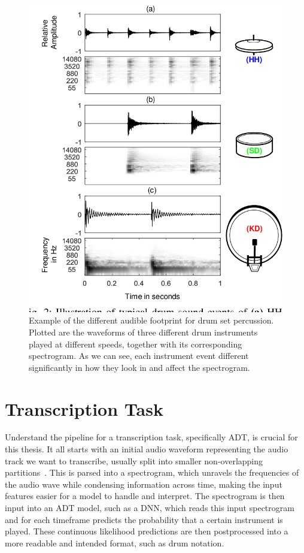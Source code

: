 \begin{figure}[H]
    \centering
    \includegraphics[scale=0.6, trim={0 1cm 0 0},clip]{figures/drumsettimbre}
    \caption{Example of the different audible footprint for drum set percussion. Plotted are the waveforms of three different drum instruments played at different speeds, together with its corresponding spectrogram. As we can see, each instrument event different significantly in how they look in and affect the spectrogram.}
    \label{DrumsetTimbreFigure}
\end{figure}

\section{Transcription Task}

Understand the pipeline for a transcription task, specifically \gls{ADT}, is crucial for this thesis. It all starts with an initial audio waveform representing the audio track we want to transcribe, usually split into smaller non-overlapping partitions~\cite{vogl2018multiinstrumentdrumtranscription, gardner2022mt3multitaskmultitrackmusic}. This is parsed into a spectrogram, which unravels the frequencies of the audio wave while condensing information across time, making the input features easier for a model to handle and interpret. The spectrogram is then input into an \gls{ADT} model, such as a \gls{DNN}, which reads this input spectrogram and for each timeframe predicts the probability that a certain instrument is played. These continuous likelihood predictions are then postprocessed into a more readable and intended format, such as drum notation.

